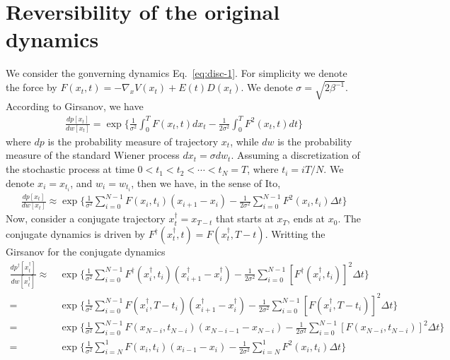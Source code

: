 \documentclass[aps, pre, preprint,unsortedaddress,a4paper,onecolumn]{revtex4}
\newcommand{\dt}[0]{\Delta t}
\begin{document}
\section{Reversibility of the original dynamics}
\label{sec:revs}

We consider the gonverning dynamics Eq.~\eqref{eq:disc-1}.
For simplicity we denote the force by $F(x_t,t) = -\nabla_x V(x_t)+ E(t)D(x_t) $.  We denote $\sigma =  \sqrt{2\beta^{-1}} $.
According to Girsanov, we have
\begin{align}
  \label{eq:tmp8}
  \frac{dp[x_t]}{dw[x_t]}  =
  \exp \bigg\{
  \frac 1{\sigma^2}\int_0^T F(x_t,t) dx_t -
  \frac1{2\sigma^2}\int_0^T F^2(x_t,t) dt
  \bigg\}
\end{align}
where $dp$ is the probability measure of trajectory $x_t$, while $dw$ is the
probability measure of the standard Wiener process $dx_t = \sigma dw_t$.
Assuming a discretization of the
stochastic process at time $0 < t_1 < t_2 < \cdots < t_N = T$, where
$t_i = iT / N$. We denote $x_i = x_{t_i}$, and $w_i = w_{t_i}$, then we have,
in the sense of Ito,
\begin{align}\label{eq:tmp9}
  \frac{dp[x_t]}{dw[x_t]}  \approx
  \exp\bigg\{\frac1{\sigma^2}\sum_{i=0}^{N-1} F(x_{i},t_{i})(x_{i+1} - x_i) -\frac1{2\sigma^2}\sum_{i=0}^{N-1}F^2(x_i,t_i)\dt\bigg\} 
\end{align}
Now, consider a conjugate trajectory $x^\dagger_t = x_{T-t}$ that starts at $x_T$, ends at $x_0$. The conjugate dynamics is driven by  $F^\dagger(x^\dagger_t,t) = F(x^\dagger_t, T-t)$.
Writting the Girsanov for the conjugate dynamics
\begin{align}\label{eq:dagger-0}
  \frac{dp^\dagger[x^\dagger_t]}{dw[x^\dagger_t]}  
  \approx\,&
  \exp\bigg\{
  \frac1{\sigma^2}\sum_{i=0}^{N-1} F^\dagger(x^\dagger_{i},t_{i})(x^\dagger_{i+1} - x^\dagger_i) -
  \frac1{2\sigma^2}\sum_{i=0}^{N-1}[F^\dagger(x^\dagger_i,t_i)]^2\dt\bigg\} \\ \nonumber
  =\,&
  \exp\bigg\{
  \frac1{\sigma^2}\sum_{i=0}^{N-1} F(x^\dagger_{i},T - t_{i})(x^\dagger_{i+1} - x^\dagger_i) -
  \frac1{2\sigma^2}\sum_{i=0}^{N-1}[F(x^\dagger_i, T-t_i)]^2\dt\bigg\} \\\nonumber
  =\,&
  \exp\bigg\{
  \frac1{\sigma^2}\sum_{i=0}^{N-1} F(x_{N-i},t_{N-i})(x_{N-i-1} - x_{N-i}) -
  \frac1{2\sigma^2}\sum_{i=0}^{N-1}[F(x_{N-i},t_{N-i})]^2\dt\bigg\} \\
  = \,&
  \exp\bigg\{
  \frac1{\sigma^2}\sum_{i=N}^{1} F(x_{i},t_{i})(x_{i-1} - x_i) -
  \frac1{2\sigma^2}\sum_{i=N}^{1}F^2(x_i,t_i)\dt\bigg\}
\end{align}
\end{document}
